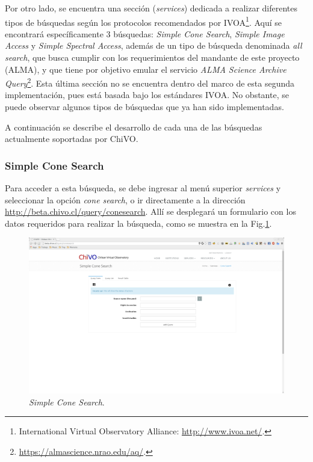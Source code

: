 Por otro lado, se encuentra una sección (\emph{services}) dedicada a
realizar diferentes tipos de búsquedas según los protocolos
recomendados por IVOA\footnote{International Virtual Observatory
Alliance: \url{http://www.ivoa.net/}.}. Aquí se encontrará
específicamente 3 búsquedas: \emph{Simple Cone Search}, \emph{Simple
Image Access} y \emph{Simple Spectral Access}, además de un tipo de
búsqueda denominada \emph{all search}, que busca cumplir con los
requerimientos del mandante de este proyecto (ALMA), y que tiene por
objetivo emular el servicio \emph{ALMA Science Archive
Query}\footnote{\url{https://almascience.nrao.edu/aq/}.}. Esta última
sección no se encuentra dentro del marco de esta segunda
implementación, pues está basada bajo los estándares IVOA. No
obstante, se puede observar algunos tipos de búsquedas que ya han sido
implementadas.

A continuación se describe el desarrollo de cada una de las búsquedas
actualmente soportadas por ChiVO.


\subsubsection{Simple Cone Search}

Para acceder a esta búsqueda, se debe ingresar al menú superior
\emph{services} y seleccionar la opción \emph{cone search}, o ir
directamente a la dirección
\url{http://beta.chivo.cl/query/conesearch}. Allí se desplegará un
formulario con los datos requeridos para realizar la búsqueda, como se
muestra en la Fig.\ref{img:scs}.

\begin{figure}[ht!]
    \begin{center}
	\includegraphics[scale=.2]{img/scs}
    \end{center}
    \caption{\emph{Simple Cone Search}.}\label{img:scs}
\end{figure}

